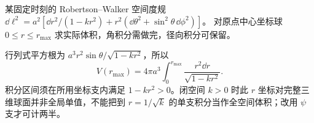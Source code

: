 \begin{exercise}
某固定时刻的 Robertson--Walker 空间度规
$\dd\ell^2=a^2[\dd r^2/(1-kr^2)+r^2(\dd\theta^2+\sin^2\theta\,\dd\phi^2)]$。
对原点中心坐标球 $0\le r\le r_{\max}$ 求实际体积，角积分需做完，径向积分可保留。
\end{exercise}
\begin{solution}
行列式平方根为 $a^3r^2\sin\theta/\sqrt{1-kr^2}$，所以
\[
V(r_{\max})=4\pi a^3\int_0^{r_{\max}}
\frac{r^2\dd r}{\sqrt{1-kr^2}}.
\]
积分区间须在所用坐标支内满足 $1-kr^2>0$。闭空间 $k>0$ 时此 $r$ 坐标对完整三维球面并非全局单值，不能把到 $r=1/\sqrt k$ 的单支积分当作全空间体积；改用 $\psi$ 支才可计两半。
\end{solution}
